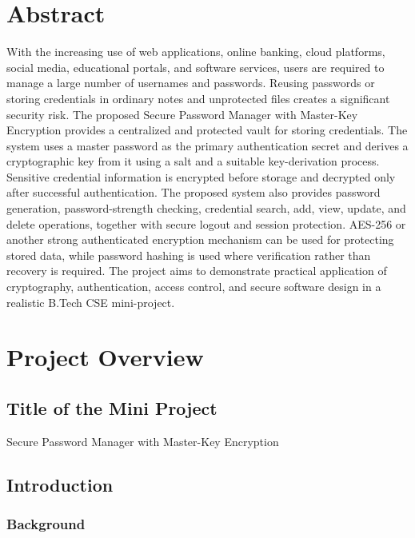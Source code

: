 \documentclass[12pt,a4paper,oneside]{report}
\begin{document}
\chapter*{Abstract}
With the increasing use of web applications, online banking, cloud platforms, social media, educational portals, and software services, users are required to manage a large number of usernames and passwords. Reusing passwords or storing credentials in ordinary notes and unprotected files creates a significant security risk. The proposed Secure Password Manager with Master-Key Encryption provides a centralized and protected vault for storing credentials. The system uses a master password as the primary authentication secret and derives a cryptographic key from it using a salt and a suitable key-derivation process. Sensitive credential information is encrypted before storage and decrypted only after successful authentication. The proposed system also provides password generation, password-strength checking, credential search, add, view, update, and delete operations, together with secure logout and session protection. AES-256 or another strong authenticated encryption mechanism can be used for protecting stored data, while password hashing is used where verification rather than recovery is required. The project aims to demonstrate practical application of cryptography, authentication, access control, and secure software design in a realistic B.Tech CSE mini-project.

\clearpage
\tableofcontents
\clearpage

\clearpage
{}

\chapter{Project Overview}

\section{Title of the Mini Project}

Secure Password Manager with Master-Key Encryption
\section{Introduction}

\subsection{Background}
\end{document}
